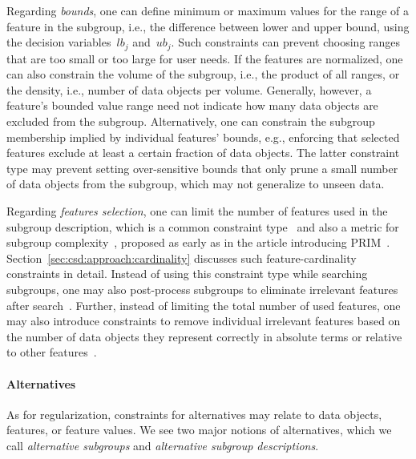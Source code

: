 \documentclass{article}
\theoremstyle{definition}
\begin{document}
Regarding \emph{bounds}, one can define minimum or maximum values for the range of a feature in the subgroup, i.e., the difference between lower and upper bound, using the decision variables~$\mathit{lb}_j$ and~$\mathit{ub}_j$.
Such constraints can prevent choosing ranges that are too small or too large for user needs.
If the features are normalized, one can also constrain the volume of the subgroup, i.e., the product of all ranges, or the density, i.e., number of data objects per volume.
Generally, however, a feature's bounded value range need not indicate how many data objects are excluded from the subgroup.
Alternatively, one can constrain the subgroup membership implied by individual features' bounds, e.g., enforcing that selected features exclude at least a certain fraction of data objects.
The latter constraint type may prevent setting over-sensitive bounds that only prune a small number of data objects from the subgroup, which may not generalize to unseen data.

Regarding \emph{features selection}, one can limit the number of features used in the subgroup description, which is a common constraint type~\cite{meeng2021real} and also a metric for subgroup complexity~\cite{atzmueller2015subgroup, helal2016subgroup, herrera2011overview, ventura2018subgroup}, proposed as early as in the article introducing PRIM~\cite{friedman1999bump}.
Section~\ref{sec:csd:approach:cardinality} discusses such feature-cardinality constraints in detail.
Instead of using this constraint type while searching subgroups, one may also post-process subgroups to eliminate irrelevant features after search~\cite{friedman1999bump}.
Further, instead of limiting the total number of used features, one may also introduce constraints to remove individual irrelevant features based on the number of data objects they represent correctly in absolute terms or relative to other features~\cite{lavrac2006relevancy}.

\paragraph{Alternatives}

As for regularization, constraints for alternatives may relate to data objects, features, or feature values.
We see two major notions of alternatives, which we call \emph{alternative subgroups} and \emph{alternative subgroup descriptions}.
\end{document}
